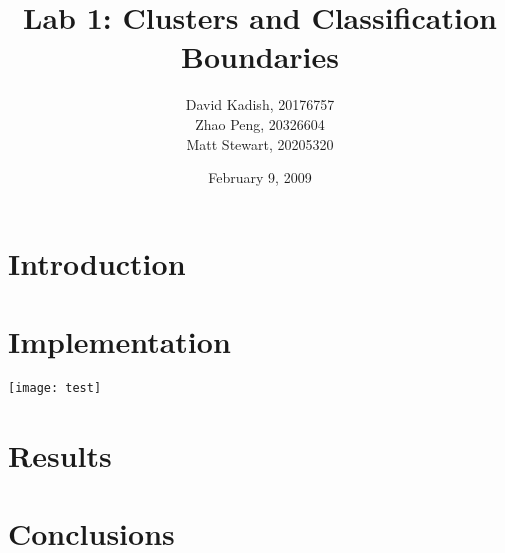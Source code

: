 \documentclass{sydeStyle}
\title{Lab 1: Clusters and Classification Boundaries}
\author{
    David Kadish, 20176757\\
    Zhao Peng, 20326604\\
    Matt Stewart, 20205320\\
}
\date{February 9, 2009}
\begin{document}

\maketitle

\setcounter{page}{2} %


\chapter{Introduction}


\chapter{Implementation}

\texttt{[image: test]}

\chapter{Results}


\chapter{Conclusions}


\appendix
\renewcommand{\thechapter}{\Alph{chapter}}
\end{document}
